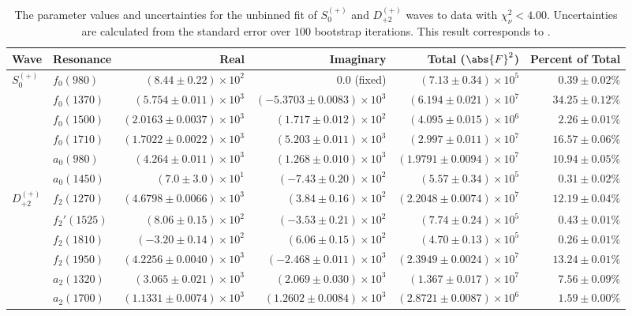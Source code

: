 \begin{table}[ht]
    \begin{center}
        \begin{tabular}{llrrrr}\toprule
        Wave & Resonance & Real & Imaginary & Total ($\abs{F}^2$) & Percent of Total \\\midrule
$S_{0}^{(+)}$ & $f_{0}(980)$ & $(8.44 \pm 0.22) \times 10^{2}$ & $0.0$ (fixed) & $(7.13 \pm 0.34) \times 10^{5}$ & $0.39 \pm 0.02 \%$ \\
 & $f_{0}(1370)$ & $(5.754 \pm 0.011) \times 10^{3}$ & $(-5.3703 \pm 0.0083) \times 10^{3}$ & $(6.194 \pm 0.021) \times 10^{7}$ & $34.25 \pm 0.12 \%$ \\
 & $f_{0}(1500)$ & $(2.0163 \pm 0.0037) \times 10^{3}$ & $(1.717 \pm 0.012) \times 10^{2}$ & $(4.095 \pm 0.015) \times 10^{6}$ & $2.26 \pm 0.01 \%$ \\
 & $f_{0}(1710)$ & $(1.7022 \pm 0.0022) \times 10^{3}$ & $(5.203 \pm 0.011) \times 10^{3}$ & $(2.997 \pm 0.011) \times 10^{7}$ & $16.57 \pm 0.06 \%$ \\
 & $a_{0}(980)$ & $(4.264 \pm 0.011) \times 10^{3}$ & $(1.268 \pm 0.010) \times 10^{3}$ & $(1.9791 \pm 0.0094) \times 10^{7}$ & $10.94 \pm 0.05 \%$ \\
 & $a_{0}(1450)$ & $(7.0 \pm 3.0) \times 10^{1}$ & $(-7.43 \pm 0.20) \times 10^{2}$ & $(5.57 \pm 0.34) \times 10^{5}$ & $0.31 \pm 0.02 \%$ \\
$D_{+2}^{(+)}$ & $f_{2}(1270)$ & $(4.6798 \pm 0.0066) \times 10^{3}$ & $(3.84 \pm 0.16) \times 10^{2}$ & $(2.2048 \pm 0.0074) \times 10^{7}$ & $12.19 \pm 0.04 \%$ \\
 & $f_{2}'(1525)$ & $(8.06 \pm 0.15) \times 10^{2}$ & $(-3.53 \pm 0.21) \times 10^{2}$ & $(7.74 \pm 0.24) \times 10^{5}$ & $0.43 \pm 0.01 \%$ \\
 & $f_{2}(1810)$ & $(-3.20 \pm 0.14) \times 10^{2}$ & $(6.06 \pm 0.15) \times 10^{2}$ & $(4.70 \pm 0.13) \times 10^{5}$ & $0.26 \pm 0.01 \%$ \\
 & $f_{2}(1950)$ & $(4.2256 \pm 0.0040) \times 10^{3}$ & $(-2.468 \pm 0.011) \times 10^{3}$ & $(2.3949 \pm 0.0024) \times 10^{7}$ & $13.24 \pm 0.01 \%$ \\
 & $a_{2}(1320)$ & $(3.065 \pm 0.021) \times 10^{3}$ & $(2.069 \pm 0.030) \times 10^{3}$ & $(1.367 \pm 0.017) \times 10^{7}$ & $7.56 \pm 0.09 \%$ \\
 & $a_{2}(1700)$ & $(1.1331 \pm 0.0074) \times 10^{3}$ & $(1.2602 \pm 0.0084) \times 10^{3}$ & $(2.8721 \pm 0.0087) \times 10^{6}$ & $1.59 \pm 0.00 \%$ \\\bottomrule
        \end{tabular}
    \caption{The parameter values and uncertainties for the unbinned fit of $S_{0}^{(+)}$ and $D_{+2}^{(+)}$ waves to data with $\chi^2_\nu < 4.00$. Uncertainties are calculated from the standard error over $100$ bootstrap iterations. This result corresponds to .}\label{tab:unbinned-fit-chisqdof-4.0-Sp0p-Dp2p}
    \end{center}
\end{table}
